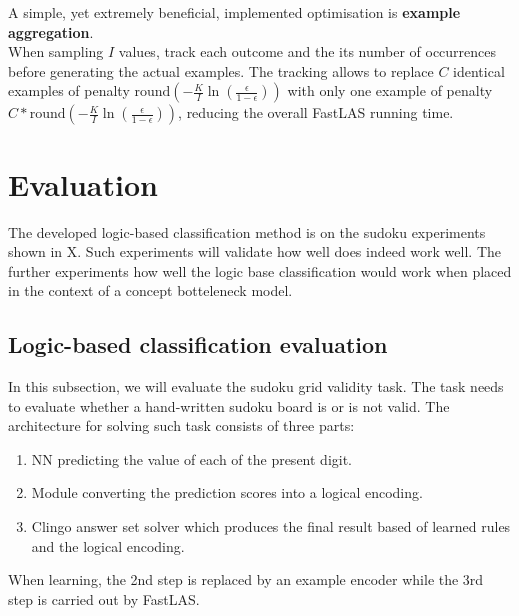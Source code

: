 A simple, yet extremely beneficial, implemented optimisation is \textbf{example aggregation}. \\
When sampling $I$ values, track each outcome and the its number of occurrences before generating the actual examples.
The tracking allows to replace $C$ identical examples of penalty $\text{round} \left ( -\frac{K}{I} \ln \left ( \frac{\epsilon}{1 - \epsilon} \right ) \right )$ with only one example of penalty $C * \text{round} \left ( -\frac{K}{I} \ln \left ( \frac{\epsilon}{1 - \epsilon} \right ) \right )$, reducing the overall FastLAS running time.



\section{Evaluation}

The developed logic-based classification method is on the sudoku experiments shown in X.
Such experiments will validate how well does indeed work well.
The further experiments how well the logic base classification would work when placed in the context of a concept botteleneck model.


\subsection{Logic-based classification evaluation}

In this subsection, we will evaluate the sudoku grid validity task.
The task needs to evaluate whether a hand-written sudoku board is or is not valid.
The architecture for solving such task consists of three parts: 
\begin{enumerate}
    \item NN predicting the value of each of the present digit.
    \item Module converting the prediction scores into a logical encoding.
    \item Clingo \cite{RefWorks:RefID:22-clingo} answer set solver which produces the final result based of learned rules and the logical encoding.
\end{enumerate}
When learning, the 2nd step is replaced by an example encoder while the 3rd step is carried out by FastLAS.


